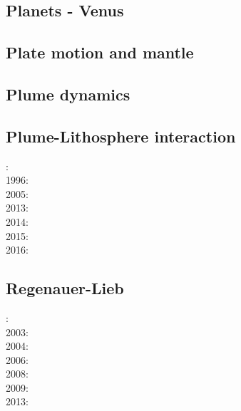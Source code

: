 \subsection*{Planets - Venus}

\cite{scbg90}
\cite{kiha92}
\cite{somo96}
\cite{mazk98}\cite{moso98}
\cite{vavv05}
\cite{arta12}
\cite{cram17}\cite{dast17}
\cite{king18}



\subsection*{Plate motion and mantle}

\noindent
\cite{zieg92a}
\cite{zhgm98}
\cite{lizh09}
\cite{huss12}
\cite{mosq13}
\cite{yoha15}

\subsection*{Plume dynamics}

\noindent
\cite{nasf94}\cite{hayu94}
\cite{lays99}
\cite{isst06}
\cite{toyu11}\cite{talz11}\cite{burk11}\cite{memm11}
\cite{dagm13}\cite{madd13}
\cite{daso15}
\cite{dacc18}

\subsection*{Plume-Lithosphere interaction}

: \cite{rich94}\\
1996: \cite{zhgm96}\\
2005: \cite{bugu05}\\
2013: \cite{bemm13}\cite{brps13}\\
2014: \cite{buge14}\\
2015: \cite{gesb15}\cite{kocb15}\cite{meds15}\\
2016: \cite{fige16}

\subsection*{Regenauer-Lieb}

: \cite{reyu00}\\
2003: \cite{reyu03}\\
2004: \cite{reyu04}\\
2006: \cite{rehy06}\cite{rewr06}\\
2008: \cite{rerw08}\\
2009: \cite{reps09}\\
2013: \cite{revp13}

